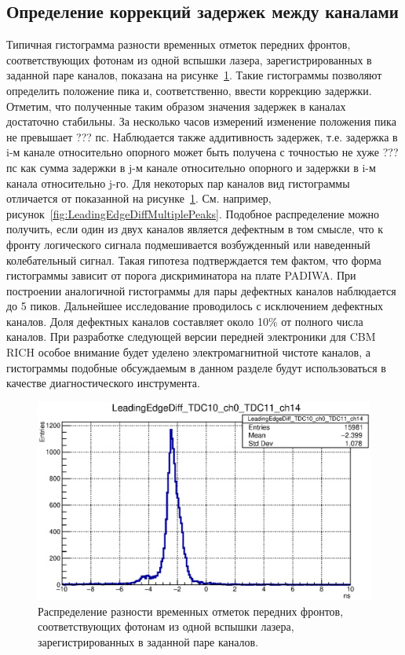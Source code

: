 \subsection{Определение коррекций задержек между каналами}\label{section:Corrections}

Типичная гистограмма разности временных отметок передних фронтов, соответствующих фотонам из одной вспышки лазера, зарегистрированных в заданной паре каналов, показана на рисунке~\ref{fig:TypicalLeadingEdgeDiff}. Такие гистограммы позволяют определить положение пика и, соответственно, ввести коррекцию задержки. Отметим, что полученные таким образом значения задержек в каналах достаточно стабильны. За несколько часов измерений изменение положения пика не превышает ??? пс. Наблюдается также аддитивность задержек, т.е. задержка в i-м канале относительно опорного может быть получена с точностью не хуже ??? пс как сумма задержки в j-м канале относительно опорного и задержки в i-м канала относительно j-го. Для некоторых пар каналов вид гистограммы отличается от показанной на рисунке~\ref{fig:TypicalLeadingEdgeDiff}. См. например, рисунок~\ref{fig:LeadingEdgeDiffMultiplePeaks}. Подобное распределение можно получить, если один из двух каналов является дефектным в том смысле, что к фронту логического сигнала подмешивается возбужденный или наведенный колебательный сигнал. Такая гипотеза подтверждается тем фактом, что форма гистограммы зависит от порога дискриминатора на плате PADIWA. При построении аналогичной гистограммы для пары дефектных каналов наблюдается до 5 пиков. Дальнейшее исследование проводилось с исключением дефектных каналов. Доля дефектных каналов составляет около 10\% от полного числа каналов. При разработке следующей версии передней электроники для CBM RICH особое внимание будет уделено электромагнитной чистоте каналов, а гистограммы подобные обсуждаемым в данном разделе будут использоваться в качестве диагностического инструмента.

\begin{figure}
\includegraphics[width=1.0\textwidth]{pictures/LeadingEdgeDiff_TDC10_ch0_TDC11_ch14.eps}
\caption{Распределение разности временных отметок передних фронтов, соответствующих фотонам из одной вспышки лазера, зарегистрированных в заданной паре каналов.}
\label{fig:TypicalLeadingEdgeDiff}
\end{figure}

